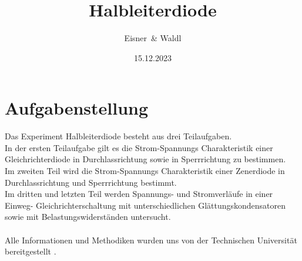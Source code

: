 \documentclass[12pt,a4paper,twoside]{article}
\begin{document}
\newcommand\laboratorynumber{2}
\title{Halbleiterdiode}
\newcommand\supervisor{Ditlbacher, Harald}
\newcommand\groupnumber{42}

\newcommand\participantonelastname{Eisner}
\newcommand\participantonefirstname{Nico}
\newcommand\participantoneid{12214121}
\newcommand\participanttwolastname{Waldl}
\newcommand\participanttwofirstname{Philip}
\newcommand\participanttwoid{12214120}
\author{\participantonelastname \ \& \participanttwolastname}

\newcommand\degreeid{UB 033 678}
\newcommand\semester{23WS}
\date{15.12.2023}

\newcommand\coursetitle{Laborübungen 2: \\ Elektrizität, Magnetismus, Optik}

%



\tableofcontents
\newpage

\section{Aufgabenstellung} %
Das Experiment Halbleiterdiode besteht aus drei Teilaufgaben. 
\\
In der ersten Teilaufgabe gilt es die Strom-Spannungs Charakteristik einer Gleichrichterdiode in Durchlassrichtung sowie in Sperrrichtung zu bestimmen. 
\\
Im zweiten Teil wird die Strom-Spannungs Charakteristik einer Zenerdiode in Durchlassrichtung und Sperrrichtung bestimmt. 
\\
Im dritten und letzten Teil werden Spannungs- und Stromverläufe in einer Einweg- Gleichrichterschaltung mit unterschiedlichen Glättungskondensatoren sowie mit Belastungswiderständen untersucht. 
\\
\\
Alle Informationen und Methodiken wurden uns von der Technischen Universität bereitgestellt \cite{teachcenter2}. 
\end{document}
